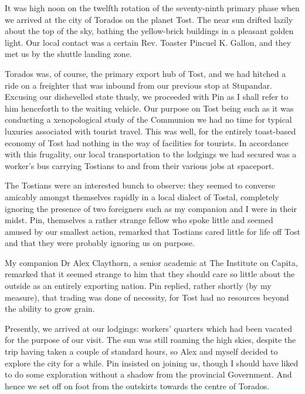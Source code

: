 It was high noon on the twelfth rotation of the seventy-ninth primary
phase when we arrived at the city of Torados on the planet Tost. The
near sun drifted lazily about the top of the sky, bathing the
yellow-brick buildings in a pleasant golden light. Our local contact
was a certain Rev. Toaster Pincuel K. Gallon, and they met us by the
shuttle landing zone.

Torados was, of course, the primary export hub of Tost, and we had
hitched a ride on a freighter that was inbound from our previous stop
at Stupandar. Excusing our dishevelled state thusly, we proceeded with
Pin \textemdash{} as I shall refer to him henceforth \textemdash{} to
the waiting vehicle. Our purpose on Tost being such as it was
\textemdash{} conducting a xenopological study of the Communion
\textemdash{} we had no time for typical luxuries associated with
tourist travel. This was well, for the entirely toast-based economy of
Tost had nothing in the way of facilities for tourists. In accordance
with this frugality, our local transportation to the lodgings we had
secured was a worker's bus carrying Tostians to and from their various
jobs at spaceport.

The Tostians were an interested bunch to observe: they seemed to
converse amicably amongst themselves rapidly in a local dialect of
Tostal, completely ignoring the presence of two foreigners
\textemdash{} such as my companion and I were \textemdash{} in their
midst. Pin, themselves a rather strange fellow who spoke little and
seemed amused by our smallest action, remarked that Tostians cared
little for life off Tost and that they were probably ignoring us on
purpose.

My companion Dr Alex Claythorn, a senior academic at The Institute on
Capita, remarked that it seemed strange to him that they should care
so little about the outside as an entirely exporting nation. Pin
replied, rather shortly (by my measure), that trading was done of
necessity, for Tost had no resources beyond the ability to grow grain.

Presently, we arrived at our lodgings: workers' quarters which had
been vacated for the purpose of our visit. The sun was still roaming
the high skies, despite the trip having taken a couple of standard
hours, so Alex and myself decided to explore the city for a while. Pin
insisted on joining us, though I should have liked to do some
exploration without a shadow from the provincial Government. And hence
we set off on foot from the outskirts towards the centre of Torados.

